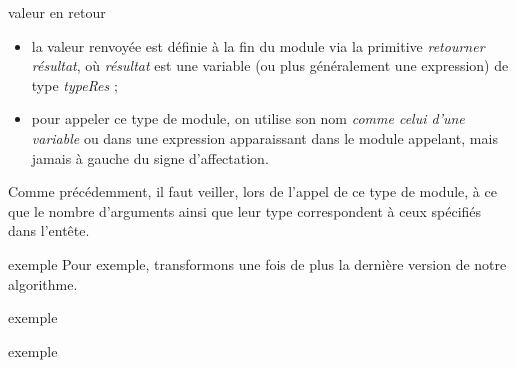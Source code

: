 \begin{frame}{valeur en retour}
	\begin{itemize}
	\item {
		{la valeur renvoyée est définie à la fin du
		module via la primitive
		}\textit{{retourner}}{
		}\textit{{résultat}}{,
		où
		}\textit{{résultat}}{
		est une variable (ou plus généralement une expression) de type
		}\textit{{typeRes}}{
		;}}
	\item {
		pour appeler ce type de module, on utilise son nom \textit{comme celui
		d’une variable} ou dans une expression apparaissant 
		dans le module appelant, mais jamais à gauche du signe
		d’affectation.}
	\end{itemize}
	
	\bigskip
	
	Comme précédemment, il faut veiller, lors de l’appel de ce 
	type de module, à ce que le nombre d’arguments ainsi que leur type
	correspondent à ceux spécifiés dans l’entête.
\end{frame}

\begin{frame}{exemple}
	Pour exemple, transformons une fois de plus la
	dernière version de notre algorithme.
	
	\bigskip
	
\end{frame}

\begin{frame}{exemple}
\end{frame}

\begin{frame}{exemple}
\end{frame}

